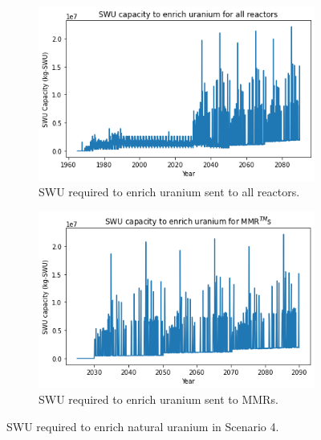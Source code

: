 \documentclass[preprint]{elsarticle}
\providecommand{\DIFaddbeginFL}{} %
\providecommand{\DIFaddendFL}{} %
\providecommand{\DIFdelbeginFL}{} %
\providecommand{\DIFdelendFL}{} %
\begin{document}
\begin{figure}
    \centering
    \DIFdelbeginFL %
\DIFdelendFL \DIFaddbeginFL \begin{subfigure}{0.45\textwidth}
        \DIFaddendFL \centering
        \DIFdelbeginFL %
\DIFdelendFL \DIFaddbeginFL \includegraphics[scale=0.4]{../figures/totalswu_scenarios_4.png}
        \DIFaddendFL \caption{\gls{SWU} required to enrich uranium sent to all reactors.}
        \label{fig:totalswu_4}
    \end{subfigure}
    \hspace{0.8cm}
    \DIFdelbeginFL %
\DIFdelendFL \DIFaddbeginFL \begin{subfigure}{0.45\textwidth}
        \DIFaddendFL \centering
        \DIFdelbeginFL %
\DIFdelendFL \DIFaddbeginFL \includegraphics[scale=0.4]{../figures/haleuSWU_scenarios_4.png}
        \DIFaddendFL \caption{\gls{SWU} required to enrich uranium sent to \glspl{MMR}.}
        \label{fig:haleuswu_4}
    \end{subfigure}
    \caption{\gls{SWU} required to enrich natural uranium in Scenario 4.}
    \label{fig:swu_4}
\end{figure}
\end{document}
